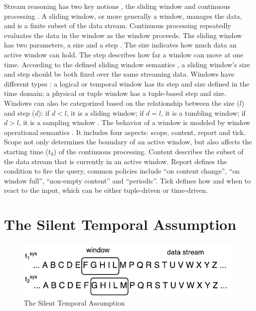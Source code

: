 Stream reasoning has two key notions \cite{barbieri2010stream}, the sliding window \cite{arasu2003stream} and continuous processing \cite{babu2001continuous}.
A sliding window, or more generally a window, manages the data, and is a finite subset of the data stream.
Continuous processing repeatedly evaluates the data in the window as the window proceeds. 
The sliding window has two parameters, a size and a step \cite{stuckenschmidt2010towards}.
The size indicates how much data an active window can hold.
The step describes how far a window can move at one time.
According to the defined sliding window semantics \cite{botan2010secret}, a sliding window's size and step should be both fixed over the same streaming data. 
Windows have different types \cite{barbieri2010querying}:
a logical or temporal window has its step and size defined in the time domain; 
a physical or tuple window has a tuple-based step and size.
Windows can also be categorized based on the relationship between the size ($l$) and step ($d$):
if $d < l$, it is a sliding window;
if $d = l$, it is a tumbling window;
if $d > l$, it is a sampling window \cite{calbimonte2010enabling}. 
The behavior of a window is modeled by window operational semantics \cite{botan2010secret} \cite{dell2013correctness}. 
It includes four aspects: scope, content, report and tick. 
Scope not only determines the boundary of an active window, but also affects the starting time ($t_{0}$) of the continuous processing.
Content describes the subset of the data stream that is currently in an active window.
Report defines the condition to fire the query, common policies include ``on content change'', ``on window full'', ``non-empty content'' and ``periodic''.
Tick defines how and when to react to the input, which can be either tuple-driven or time-driven.  
%
\section{The Silent Temporal Assumption}

\begin{figure}[!htbp]
	\centering
    \includegraphics[width=5in]{img/1-sta.pdf}
    \caption{The Silent Temporal Assumption}
    \label{fig:1-sta}
\end{figure}

